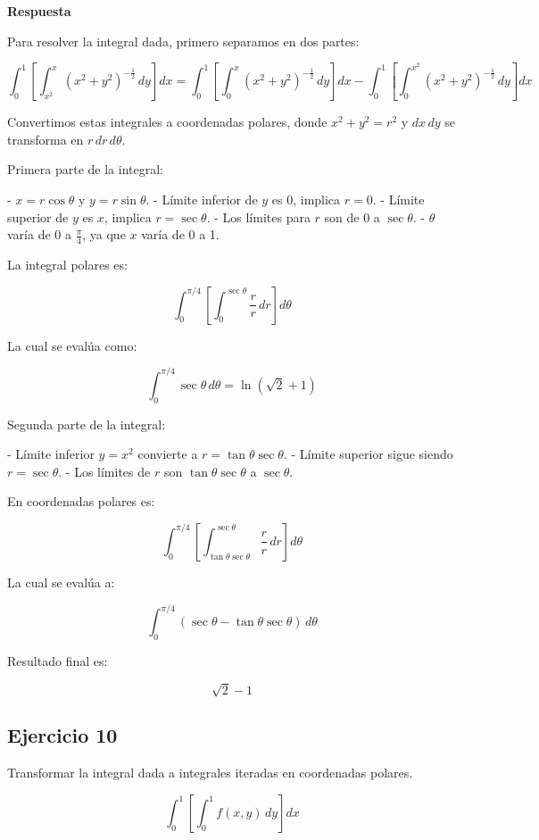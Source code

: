 \documentclass{report}
\begin{document}
\textbf{Respuesta}

Para resolver la integral dada, primero separamos en dos partes:

\[
\int_{0}^{1}\left[\int_{x^2}^{x}{\left(x^2+y^2\right)^{-\frac{1}{2}} \, dy}\right]dx = \int_{0}^{1}\left[\int_{0}^{x}{\left(x^2+y^2\right)^{-\frac{1}{2}} \, dy}\right]dx - \int_{0}^{1}\left[\int_{0}^{x^2}{\left(x^2+y^2\right)^{-\frac{1}{2}} \, dy}\right]dx
\]

Convertimos estas integrales a coordenadas polares, donde \(x^2 + y^2 = r^2\) y \(dx \, dy\) se transforma en \(r \, dr \, d\theta\).

Primera parte de la integral:

- \(x = r \cos \theta\) y \(y = r \sin \theta\).
- Límite inferior de \(y\) es 0, implica \(r = 0\).
- Límite superior de \(y\) es \(x\), implica \(r = \sec \theta\).
- Los límites para \(r\) son de 0 a \(\sec \theta\).
- \(\theta\) varía de \(0\) a \(\frac{\pi}{4}\), ya que \(x\) varía de 0 a 1.

La integral polares es:

\[
\int_{0}^{\pi/4} \left[\int_{0}^{\sec{\theta}} \frac{r}{r} \, dr\right] d\theta
\]

La cual se evalúa como:

\[
\int_{0}^{\pi/4} \sec \theta \, d\theta = \ln(\sqrt{2} + 1)
\]

Segunda parte de la integral:

- Límite inferior \(y = x^2\) convierte a \(r = \tan \theta \sec \theta\).
- Límite superior sigue siendo \(r = \sec \theta\).
- Los límites de \(r\) son \(\tan \theta \sec \theta\) a \(\sec \theta\).

En coordenadas polares es:

\[
\int_{0}^{\pi/4} \left[\int_{\tan{\theta}\sec{\theta}}^{\sec{\theta}} \frac{r}{r} \, dr \right] d\theta
\]

La cual se evalúa a:

\[
\int_{0}^{\pi/4} \left( \sec \theta - \tan \theta \sec \theta \right) \, d\theta
\]

Resultado final es:

\[
\boxed{\sqrt{2} - 1}
\]\subsection{Ejercicio 10}
Transformar la integral dada a integrales iteradas en coordenadas polares.

$$\int_{0}^{1}\left[\int_{0}^{1} f(x, y) \, dy\right] dx$$
\end{document}
